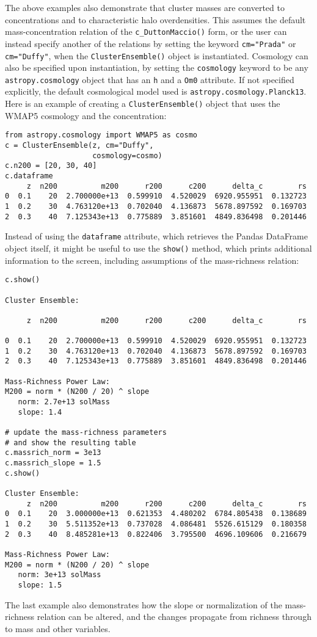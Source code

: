\documentclass[twocolumn]{aastex6}
\newcommand{\code}{\lstinline[style=codeintext]}
\begin{document}
The above examples also demonstrate that cluster masses are converted to concentrations and to characteristic halo overdensities. This assumes the default mass-concentration relation of the \code{c_DuttonMaccio()} form, or the user can instead specify another of the relations by setting the keyword \code{cm="Prada"} or \code{cm="Duffy"}, when the \code{ClusterEnsemble()} object is instantiated. Cosmology can also be specified upon instantiation, by setting the \code{cosmology} keyword to be any \code{astropy.cosmology} object that has an \code{h} and a \code{Om0} attribute. If not specified explicitly, the default cosmological model used is \code{astropy.cosmology.Planck13}. Here is an example of creating a \code{ClusterEnsemble()} object that uses the WMAP5 cosmology \citep{WMAP5} and the \citet{Duffy08} concentration:
\begin{lstlisting}
from astropy.cosmology import WMAP5 as cosmo
c = ClusterEnsemble(z, cm="Duffy", 
                    cosmology=cosmo)
c.n200 = [20, 30, 40]
c.dataframe
     z  n200          m200      r200      c200      delta_c        rs
0  0.1    20  2.700000e+13  0.599910  4.520029  6920.955951  0.132723
1  0.2    30  4.763120e+13  0.702040  4.136873  5678.897592  0.169703
2  0.3    40  7.125343e+13  0.775889  3.851601  4849.836498  0.201446
\end{lstlisting}
Instead of using the \code{dataframe} attribute, which retrieves the Pandas DataFrame object itself, it might be useful to use the \code{show()} method, which prints additional information to the screen, including assumptions of the mass-richness relation:
\begin{lstlisting}
c.show()

Cluster Ensemble:

     z  n200          m200      r200      c200      delta_c        rs

0  0.1    20  2.700000e+13  0.599910  4.520029  6920.955951  0.132723
1  0.2    30  4.763120e+13  0.702040  4.136873  5678.897592  0.169703
2  0.3    40  7.125343e+13  0.775889  3.851601  4849.836498  0.201446

Mass-Richness Power Law:
M200 = norm * (N200 / 20) ^ slope
   norm: 2.7e+13 solMass
   slope: 1.4

# update the mass-richness parameters
# and show the resulting table
c.massrich_norm = 3e13
c.massrich_slope = 1.5
c.show()

Cluster Ensemble:
     z  n200          m200      r200      c200      delta_c        rs
0  0.1    20  3.000000e+13  0.621353  4.480202  6784.805438  0.138689
1  0.2    30  5.511352e+13  0.737028  4.086481  5526.615129  0.180358
2  0.3    40  8.485281e+13  0.822406  3.795500  4696.109606  0.216679

Mass-Richness Power Law:
M200 = norm * (N200 / 20) ^ slope
   norm: 3e+13 solMass
   slope: 1.5

\end{lstlisting}
The last example also demonstrates how the slope or normalization of the mass-richness relation can be altered, and the changes propagate from richness through to mass and other variables.
\end{document}
